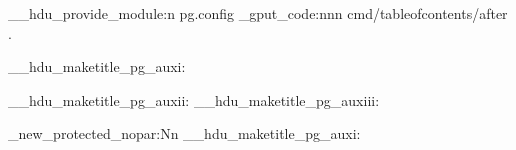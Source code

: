 \ExplSyntaxOn \makeatletter
\__hdu_provide_module:n {pg.config}
\geometry { top = 2.8cm, bottom = 3.2cm, left = 3.2cm, right = 3.2cm,
            headheight = 15pt, headsep = .72cm, footskip = 1.5cm }
\hook_gput_code:nnn { cmd/tableofcontents/after } { . }
  {
    \clearpage
    \cfoot{\small \thepage}
  }
\RenewDocumentCommand \maketitle {}
  {
    \begin{titlepage}
      \__hdu_maketitle_pg_auxi:
    \end{titlepage}
    \titlepage
      \__hdu_maketitle_pg_auxii:
    \endtitlepage
    \titlepage
      \__hdu_maketitle_pg_auxiii:
    \endtitlepage
    \restoregeometry
    \cfoot {\small \thepage}
  }
\cs_new_protected_nopar:Nn \__hdu_maketitle_pg_auxi:
